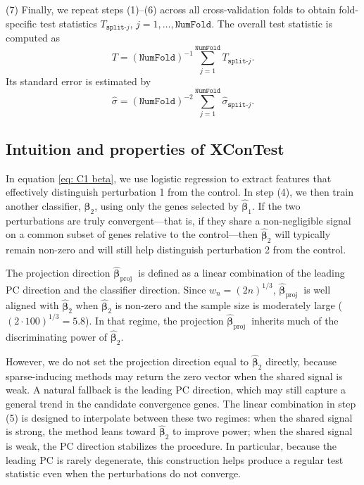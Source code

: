 \documentclass[11pt]{article}
\begin{document}
(7) Finally, we repeat steps (1)–(6) across all cross-validation folds to obtain fold-specific test statistics $T_{\texttt{split-}j}$, $j = 1,\ldots,\texttt{NumFold}$. The overall test statistic is computed as
$$
T = (\texttt{NumFold})^{-1}\sum_{j=1}^{\texttt{NumFold}} T_{\texttt{split-}j}.
$$
Its standard error is estimated by
$$
\hat\sigma = (\texttt{NumFold})^{-2}\sum_{j=1}^{\texttt{NumFold}} \hat\sigma_{\texttt{split-}j}.
$$

\subsection*{Intuition and properties of XConTest}


In equation \eqref{eq: C1 beta}, we use logistic regression to extract features that effectively distinguish perturbation 1 from the control. In step (4), we then train another classifier, $\hat{\bm \beta}_2$, using only the genes selected by $\widehat{\bm{\beta}}_1$. If the two perturbations are truly convergent---that is, if they share a non-negligible signal on a common subset of genes relative to the control---then $\hat{\bm \beta}_2$ will typically remain non-zero and will still help distinguish perturbation 2 from the control.

The projection direction $\widehat{\boldsymbol{\beta}}_{\text {proj }}$ is defined as a linear combination of the leading PC direction and the classifier direction. Since $w_n = (2n)^{1/3}$, $\widehat{\boldsymbol{\beta}}_{\text {proj }}$ is well aligned with $\widehat{\boldsymbol{\beta}}_2$ when $\widehat{\boldsymbol{\beta}}_2$ is non-zero and the sample size is moderately large ($(2\cdot 100)^{1/3} = 5.8$). In that regime, the projection $\widehat{\boldsymbol{\beta}}_{\text {proj }}$ inherits much of the discriminating power of $\widehat{\boldsymbol{\beta}}_2$.

However, we do not set the projection direction equal to $\widehat{\boldsymbol{\beta}}_2$ directly, because sparse-inducing methods may return the zero vector when the shared signal is weak. A natural fallback is the leading PC direction, which may still capture a general trend in the candidate convergence genes. The linear combination in step (5) is designed to interpolate between these two regimes: when the shared signal is strong, the method leans toward $\widehat{\boldsymbol{\beta}}_2$ to improve power; when the shared signal is weak, the PC direction stabilizes the procedure. In particular, because the leading PC is rarely degenerate, this construction helps produce a regular test statistic even when the perturbations do not converge.
\end{document}

